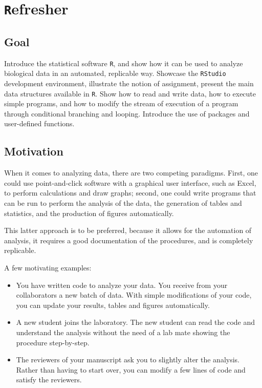 \documentclass[
  letterpaper,
  DIV=11,
  numbers=noendperiod]{scrreprt}
\begin{document}
\hypertarget{refresher}{%
\chapter{\texorpdfstring{\texttt{R}efresher}{Refresher}}\label{refresher}}

\hypertarget{goal}{%
\section{Goal}\label{goal}}

Introduce the statistical software \texttt{R}, and show how it can be
used to analyze biological data in an automated, replicable way.
Showcase the \texttt{RStudio} development environment, illustrate the
notion of assignment, present the main data structures available in
\texttt{R}. Show how to read and write data, how to execute simple
programs, and how to modify the stream of execution of a program through
conditional branching and looping. Introduce the use of packages and
user-defined functions.

\hypertarget{motivation}{%
\section{Motivation}\label{motivation}}

When it comes to analyzing data, there are two competing paradigms.
First, one could use point-and-click software with a graphical user
interface, such as Excel, to perform calculations and draw graphs;
second, one could write programs that can be run to perform the analysis
of the data, the generation of tables and statistics, and the production
of figures automatically.

This latter approach is to be preferred, because it allows for the
automation of analysis, it requires a good documentation of the
procedures, and is completely replicable.

A few motivating examples:

\begin{itemize}
\item
  You have written code to analyze your data. You receive from your
  collaborators a new batch of data. With simple modifications of your
  code, you can update your results, tables and figures automatically.
\item
  A new student joins the laboratory. The new student can read the code
  and understand the analysis without the need of a lab mate showing the
  procedure step-by-step.
\item
  The reviewers of your manuscript ask you to slightly alter the
  analysis. Rather than having to start over, you can modify a few lines
  of code and satisfy the reviewers.
\end{itemize}
\end{document}
